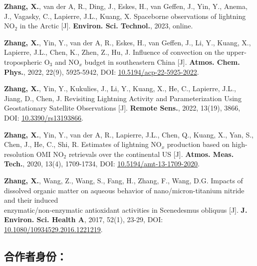 \begin{enumerate}[label={[\arabic*]}, leftmargin=20pt, widest=0, itemindent=*, topsep=0pt, partopsep=0pt, parsep=0pt]

\item \textbf{Zhang, X.}, van der A, R., Ding, J., Eskes, H., van Geffen, J., Yin, Y., Anema, J.,
Vagasky, C., Lapierre, J.L., Kuang, X. Spaceborne observations of lightning
NO$_2$ in the Arctic [J]. \textbf{Environ. Sci. Technol.}, 2023, online. %

\item \textbf{Zhang, X.}, Yin, Y., van der A, R., Eskes, H., van Geffen, J., Li, Y., Kuang, X., Lapierre,
J.L., Chen, K., Zhen, Z., Hu, J. Influence of convection on the
upper-tropospheric O$_3$ and NO$_x$ budget in southeastern China [J].
\textbf{Atmos. Chem. Phys.}, 2022, 22(9), 5925-5942,
DOI: \underline{\href{https://doi.org/10.5194/acp-22-5925-2022}{10.5194/acp-22-5925-2022}}.

\item \textbf{Zhang, X.}, Yin, Y., Kukulies, J., Li, Y., Kuang, X., He, C., Lapierre, J.L., Jiang, D., Chen,
J. Revisiting Lightning Activity and Parameterization Using Geostationary
Satellite Observations [J].
\textbf{Remote Sens.}, 2022, 13(19), 3866,
DOI: \underline{\href{https://doi.org/10.3390/rs13193866}{10.3390/rs13193866}}.

\item \textbf{Zhang, X.}, Yin, Y., van der A, R., Lapierre, J.L., Chen, Q., Kuang, X., Yan, S., Chen, J.,
He, C., Shi, R. Estimates of lightning NO$_x$ production based on high-resolution
OMI NO$_2$ retrievals over the continental US [J].
\textbf{Atmos. Meas. Tech.}, 2020, 13(4), 1709-1734,
DOI: \underline{\href{https://doi.org/10.5194/amt-13-1709-2020}{10.5194/amt-13-1709-2020}}.

\item \textbf{Zhang, X.}, Wang, Z., Wang, S., Fang, H., Zhang, F., Wang, D.G.
Impacts of dissolved organic matter on aqueous behavior of nano/micron-titanium nitride and their induced \\
enzymatic/non-enzymatic antioxidant activities in Scenedesmus obliquus [J].
\textbf{J. Environ. Sci. Health A}, 2017, 52(1), 23-29,
DOI: \underline{\href{https://doi.org/10.1080/10934529.2016.1221219}{10.1080/10934529.2016.1221219}}.

\end{enumerate}

\subsection*{合作者身份：}


